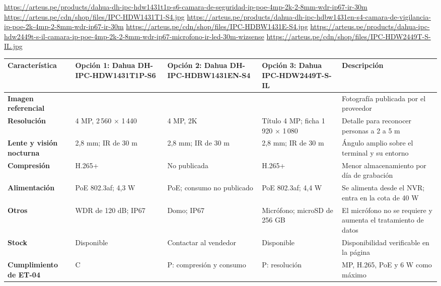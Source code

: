 \begin{landscape}
\urldef{\cotubc}\url{https://arteus.pe/products/dahua-dh-ipc-hdw1431t1p-s6-camara-de-seguridad-ip-poe-4mp-2k-2-8mm-wdr-ip67-ir-30m}
\urldef{\cotubd}\url{https://arteus.pe/cdn/shop/files/IPC-HDW1431T1-S4.jpg}
\urldef{\cotube}\url{https://arteus.pe/products/dahua-dh-ipc-hdbw1431en-s4-camara-de-vigilancia-ip-poe-2k-4mp-2-8mm-wdr-ip67-ir-30m}
\urldef{\cotubf}\url{https://arteus.pe/cdn/shop/files/IPC-HDBW1431E-S4.jpg}
\urldef{\cotubg}\url{https://arteus.pe/products/dahua-ipc-hdw2449t-s-il-camara-ip-poe-4mp-2k-2-8mm-wdr-ip67-microfono-ir-led-30m-wizsense}
\urldef{\cotubh}\url{https://arteus.pe/cdn/shop/files/IPC-HDW2449T-S-IL.jpg}
\par\noindent\begin{minipage}{\linewidth}\formatofichas\scriptsize\renewcommand{\arraystretch}{1.0}
\label{tab:cot-cam}
\begin{tabularx}{\linewidth}{@{}>{\raggedright\arraybackslash}p{3.0cm}YYY>{\raggedright\arraybackslash}p{4.4cm}@{}}
\toprule
\textbf{Característica} & \textbf{Opción 1: Dahua DH-IPC-HDW1431T1P-S6} & \textbf{Opción 2: Dahua DH-IPC-HDBW1431EN-S4} & \textbf{Opción 3: Dahua IPC-HDW2449T-S-IL} & \textbf{Descripción}\\\midrule
\textbf{Imagen referencial} &  &  &  & Fotografía publicada por el proveedor\\
\textbf{Resolución} & 4 MP, 2\,560 $\times$ 1\,440 & 4 MP, 2K & Título 4 MP; ficha 1\,920 $\times$ 1\,080 & Detalle para reconocer personas a 2 a 5 m\\
\textbf{Lente y visión nocturna} & 2,8 mm; IR de 30 m & 2,8 mm; IR de 30 m & 2,8 mm; IR de 30 m & Ángulo amplio sobre el terminal y su entorno\\
\textbf{Compresión} & H.265+ & No publicada & H.265+ & Menor almacenamiento por día de grabación\\
\textbf{Alimentación} & PoE 802.3af; 4,3 W & PoE; consumo no publicado & PoE 802.3af; 4,4 W & Se alimenta desde el NVR; entra en la cota de 40 W\\
\textbf{Otros} & WDR de 120 dB; IP67 & Domo; IP67 & Micrófono; microSD de 256 GB & El micrófono no se requiere y aumenta el tratamiento de datos\\
\textbf{Stock} & Disponible & Contactar al vendedor & Disponible & Disponibilidad verificable en la página\\
\textbf{Cumplimiento de ET-04} & C & P: compresión y consumo & P: resolución & 4 MP, H.265, PoE y 6 W como máximo\\

\end{tabularx}
\end{minipage}
\end{landscape}
